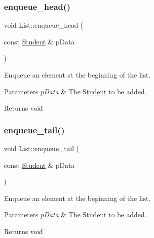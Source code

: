 \subsubsection{\texorpdfstring{enqueue\+\_\+head()}{enqueue\_head()}}
{\footnotesize\ttfamily void List\+::enqueue\+\_\+head (\begin{DoxyParamCaption}\item[{const \hyperlink{class_student}{Student} \&}]{p\+Data }\end{DoxyParamCaption})}



Enqueue an element at the beginning of the list. 


\begin{DoxyParams}{Parameters}
{\em p\+Data} & The \hyperlink{class_student}{Student} to be added. \\
\hline
\end{DoxyParams}
\begin{DoxyReturn}{Returns}
void 
\end{DoxyReturn}
\mbox{\label{class_list_a8d121a27df3b8984d0ac7edc87d14af5}} 
\subsubsection{\texorpdfstring{enqueue\+\_\+tail()}{enqueue\_tail()}}
{\footnotesize\ttfamily void List\+::enqueue\+\_\+tail (\begin{DoxyParamCaption}\item[{const \hyperlink{class_student}{Student} \&}]{p\+Data }\end{DoxyParamCaption})}



Enqueue an element at the beginning of the list. 


\begin{DoxyParams}{Parameters}
{\em p\+Data} & The \hyperlink{class_student}{Student} to be added. \\
\hline
\end{DoxyParams}
\begin{DoxyReturn}{Returns}
void 
\end{DoxyReturn}
\mbox{\label{class_list_aeff87699c50ed381ba1e765d372ad54b}} 
